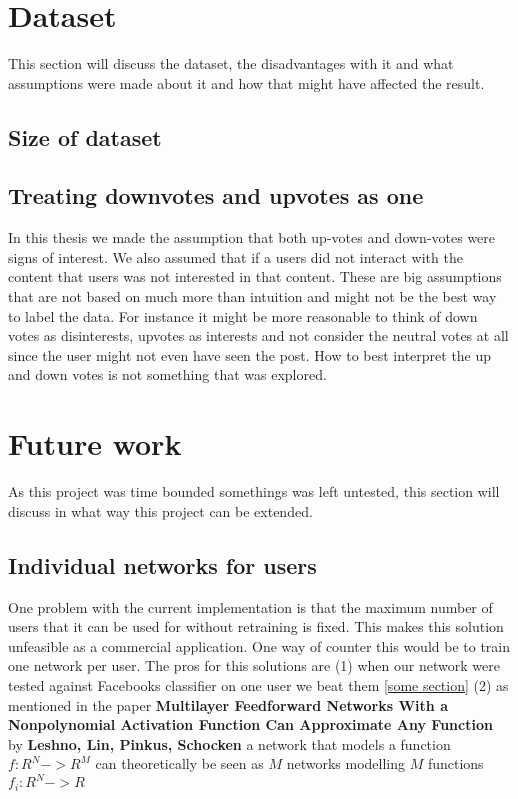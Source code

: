 \section{Dataset}
This section will discuss the dataset, the disadvantages with it and what assumptions were made about it and how that might have affected the result.
\subsection{Size of dataset}
\subsection{Treating downvotes and upvotes as one}
In this thesis we made the assumption that both up-votes and down-votes were signs of interest. We also assumed that if a users did not interact with the content that users was not interested in that content. These are big assumptions that are not based on much more than intuition and might not be the best way to label the data. For instance it might be more reasonable to think of down votes as disinterests, upvotes as interests and not consider the neutral votes at all since the user might not even have seen the post. How to best interpret the up and down votes is not something that was explored.

\section{Future work}
As this project was time bounded somethings was left untested, this section will discuss in what way this project can be extended.

\subsection{Individual networks for users}
One problem with the current implementation is that the maximum number of users that it can be used for without retraining is fixed. This makes this solution unfeasible as a commercial application. One way of counter this would be to train one network per user.
The pros for this solutions are (1) when our network were tested against Facebooks classifier on one user we beat them \ref{some section} (2) as mentioned in the paper \textbf{Multilayer Feedforward Networks With a Nonpolynomial Activation Function Can Approximate Any Function} by \textbf{Leshno, Lin, Pinkus, Schocken} a network that models a function $f:R^N->R^M$ can theoretically be seen as $M$ networks modelling $M$ functions $f_i:R^N->R$ \parencite{leshno1993multilayer} 

